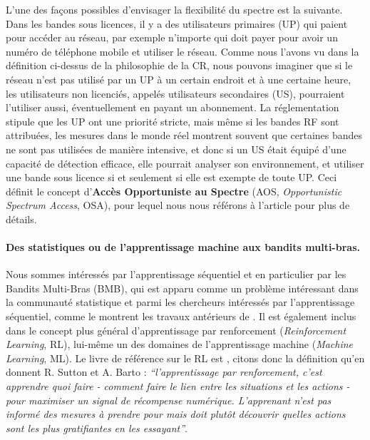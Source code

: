 \begin{resume_fr}
L'une des façons possibles d'envisager la flexibilité du spectre est la suivante.
%
Dans les bandes sous licences, il y a des utilisateurs primaires (UP) qui paient pour accéder au réseau, par exemple n'importe qui doit payer pour avoir un numéro de téléphone mobile et utiliser le réseau.
Comme nous l'avons vu dans la définition ci-dessus de la philosophie de la CR, nous pouvons imaginer que si le réseau n'est pas utilisé par un UP à un certain endroit et à une certaine heure, les utilisateurs non licenciés, appelés utilisateurs secondaires (US), pourraient l'utiliser aussi, éventuellement en payant un abonnement.
%
La réglementation stipule que les UP ont une priorité stricte,
mais même si les bandes RF sont attribuées, les mesures dans le monde réel montrent souvent que certaines bandes ne sont pas utilisées de manière intensive, et donc si un US était équipé d'une capacité de détection efficace, elle pourrait analyser son environnement, et utiliser une bande sous licence si et seulement si elle est exempte de toute UP.
Ceci définit le concept d'\textbf{Accès Opportuniste au Spectre} (AOS, \emph{Opportunistic Spectrum Access}, OSA), pour lequel nous nous référons à l'article \cite{Zhao07} pour plus de détails.


\paragraph{Des statistiques ou de l'apprentissage machine aux bandits multi-bras.}
%
Nous sommes intéressés par l'apprentissage séquentiel et en particulier par les Bandits Multi-Bras (BMB),
qui est apparu comme un problème intéressant dans la communauté statistique et parmi les chercheurs intéressés par l'apprentissage séquentiel, comme le montrent les travaux antérieurs de \cite{Thompson33,Robbins52,LaiRobbins85}.
Il est également inclus dans le concept plus général d'apprentissage par renforcement (\emph{Reinforcement Learning}, RL), lui-même un des domaines de l'apprentissage machine (\emph{Machine Learning}, ML).
%
Le livre de référence sur le RL est \cite{SuttonBarto2018}, citons donc la définition qu'en donnent R. Sutton et A. Barto :
\emph{``l'apprentissage par renforcement, c'est apprendre quoi faire - comment faire le lien entre les situations et les actions -
pour maximiser un signal de récompense numérique. L'apprenant n'est pas informé des mesures à prendre pour
mais doit plutôt découvrir quelles actions sont les plus gratifiantes en les essayant''}.



\end{resume_fr}
